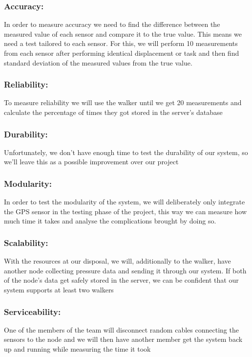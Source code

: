 \subsubsection{Accuracy:}
In order to measure accuracy we need to find the difference between the measured value of each sensor and compare it to the true value. This means we need a test tailored to each sensor. For this, we will perform 10 measurements from each sensor after performing identical displacement or task and then find standard deviation of the measured values from the true value.

\subsubsection{Reliability:}
To measure reliability we will use the walker until we get 20 measurements and calculate the percentage of times they got stored in the server’s database


\subsubsection{Durability:}
Unfortunately, we don’t have enough time to test the durability of our system, so we’ll leave this as a possible improvement over our project



\subsubsection{Modularity:}
In order to test the modularity of the system, we will deliberately only integrate the GPS sensor in the testing phase of the project, this way we can measure how much time it takes and analyse the complications brought by doing so.

\subsubsection{Scalability:}
With the resources at our disposal, we will, additionally to the walker, have another node collecting pressure data and sending it through our system. If both of the node’s data get safely stored in the server, we can be confident that our system supports at least two walkers

\subsubsection{Serviceability:}
One of the members of the team will disconnect random cables connecting the sensors to the node and we will then have another member get the system back up and running while measuring the time it took


